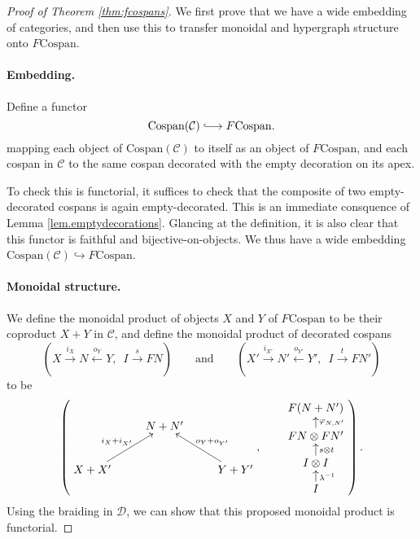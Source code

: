 \begin{proof}[Proof of Theorem \ref{thm:fcospans}]
We first prove that we have a wide embedding of categories, and then use this to
transfer monoidal and hypergraph structure onto $F\mathrm{Cospan}$.

\paragraph{Embedding.} 
Define a functor
\[
  \mathrm{Cospan(\mathcal C)} \hooklongrightarrow F\mathrm{Cospan}.
\]
mapping each object of $\mathrm{Cospan(\mathcal C)}$ to itself as an object
of $F\mathrm{Cospan}$, and each cospan in $\mathcal C$ to the same cospan
decorated with the empty decoration on its apex. 

To check this is functorial, it suffices to check that the composite of two
empty-decorated cospans is again empty-decorated. This is an immediate
consquence of Lemma \ref{lem.emptydecorations}. Glancing at the definition, it
is also clear that this functor is faithful and bijective-on-objects. We thus
have a wide embedding $\mathrm{Cospan(\mathcal{C})} \hookrightarrow
F\mathrm{Cospan}$.

\paragraph{Monoidal structure.} 

We define the monoidal product of objects $X$ and $Y$ of $F\mathrm{Cospan}$ to
be their coproduct $X+Y$ in $\mathcal C$, and define the monoidal product of
decorated cospans 
\[
  (X \stackrel{i_X}\longrightarrow N
  \stackrel{o_Y}\longleftarrow Y,\enspace I \stackrel{s}\longrightarrow FN)
  \qquad \mbox{and} \qquad
  (X' \stackrel{i_{X'}}\longrightarrow N' \stackrel{o_{Y'}}\longleftarrow
  Y',\enspace I \stackrel{t}\longrightarrow FN')
\]
to be 
\[
  \left(
  \begin{aligned}
    \xymatrix{
      & N+N' \\  
      X+X' \ar[ur]^{i_X+i_{X'}} && Y+Y' \ar[ul]_{o_Y+o_{Y'}}
    }
  \end{aligned}
  ,
  \qquad
  \begin{aligned}
    \xymatrixrowsep{.8pc}
    \xymatrix{
      F(N+N') \\
      FN \otimes FN' \ar[u]_{\varphi_{N,N'}}\\
      I \otimes I \ar[u]_{s \otimes t} \\
      I \ar[u]_{\lambda^{-1}}
    }
  \end{aligned}
  \right).
\]
Using the braiding in $\mathcal D$, we can show that this proposed monoidal
product is functorial. 


\end{proof}
